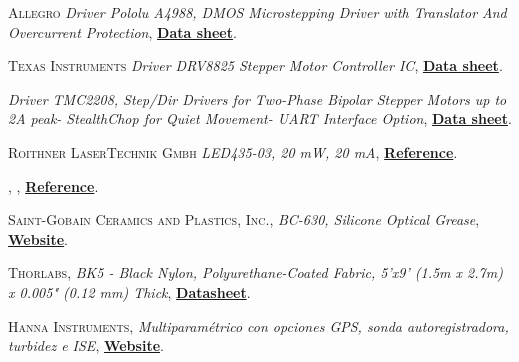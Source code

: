 \begin{thebibliography}{100}
 \textsc{Allegro}
\textit{Driver Pololu A4988, DMOS Microstepping Driver with Translator And Overcurrent Protection}, \href{https://www.alldatasheet.es/datasheet-pdf/pdf/455036/ALLEGRO/A4988.html}{\textbf{Data sheet}}.

 \textsc{Texas Instruments}
\textit{Driver DRV8825 Stepper Motor Controller IC}, \href{https://www.ti.com/product/DRV8825?utm_source=google&utm_medium=cpc&utm_campaign=asc-null-null-GPN_EN-cpc-pf-google-wwe&utm_content=DRV8825&ds_k=DRV8825+Datasheet&DCM=yes&gclid=EAIaIQobChMIworWtYba7gIVqoFQBh10_QfhEAAYASAAEgLPn_D_BwE&gclsrc=aw.ds}{\textbf{Data sheet}}.

\textit{Driver TMC2208, Step/Dir Drivers for Two-Phase Bipolar Stepper Motors up to 2A peak- StealthChop for Quiet Movement- UART Interface Option}, \href{https://datasheetspdf.com/pdf/1142008/TRINAMIC/TMC2225/1}{\textbf{Data sheet}}.

 \textsc{Roithner LaserTechnik Gmbh}
\textit{LED435-03, 20 mW, 20 mA}, \href{http://www.roithner-laser.com/led_diverse.html}{\textbf{Reference}}.

 \textsc{},
\textit{}, \href{}{\textbf{Reference}}.

 \textsc{Saint-Gobain Ceramics and Plastics, Inc.},
\textit{BC-630, Silicone Optical Grease}, \href{https://www.crystals.saint-gobain.com/}{\textbf{Website}}.

 \textsc{Thorlabs},
\textit{BK5 - Black Nylon, Polyurethane-Coated Fabric, 5'x9' (1.5m x 2.7m) x 0.005" (0.12 mm) Thick}, \href{https://www.thorlabs.com/thorproduct.cfm?partnumber=BK5}{\textbf{Datasheet}}.

 \textsc{Hanna Instruments},
\textit{Multiparamétrico con opciones GPS, sonda autoregistradora, turbidez e ISE}, \href{https://www.hannainst.es/parametros/4654-multiparametrico-portatil-con-portasondas-multisensor-ph-orp-ce-od-temperatura.html#/507-cable_m-4_m/512-portasondas-si/513-portasondas_registrador-no/514-gps-no/515-turbidez-no}{\textbf{Website}}.



\end{thebibliography}
